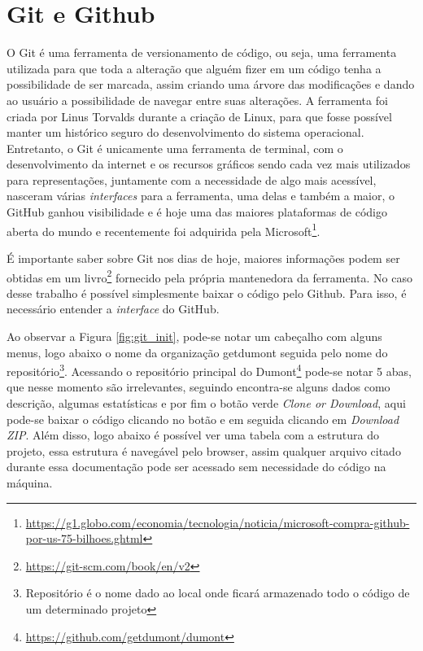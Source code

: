 \chapter{Git e Github}
\label{app:git}
O Git é uma ferramenta de versionamento de código, ou seja, uma ferramenta utilizada para que toda a alteração que alguém fizer em um código tenha a possibilidade de ser marcada, assim criando uma árvore das modificações e dando ao usuário a possibilidade de navegar entre suas alterações. A ferramenta foi criada por Linus Torvalds durante a criação de Linux, para que fosse possível manter um histórico seguro do desenvolvimento do sistema operacional. Entretanto, o Git é unicamente uma ferramenta de terminal, com o desenvolvimento da internet e os recursos gráficos sendo cada vez mais utilizados para representações, juntamente com a necessidade de algo mais acessível, nasceram várias \textit{interfaces} para a ferramenta, uma delas e também a maior, o GitHub ganhou visibilidade e é hoje uma das maiores plataformas de código aberta do mundo e recentemente foi adquirida pela Microsoft\footnote{\url{https://g1.globo.com/economia/tecnologia/noticia/microsoft-compra-github-por-us-75-bilhoes.ghtml}}.

É importante saber sobre Git nos dias de hoje, maiores informações podem ser obtidas em um livro\footnote{\url{https://git-scm.com/book/en/v2}} fornecido pela própria mantenedora da ferramenta. No caso desse trabalho é possível simplesmente baixar o código pelo Github. Para isso, é necessário entender a \textit{interface} do GitHub.

Ao observar a Figura \ref{fig:git_init}, pode-se notar um cabeçalho com alguns menus, logo abaixo o nome da organização getdumont seguida pelo nome do repositório\footnote{Repositório é o nome dado ao local onde ficará armazenado todo o código de um determinado projeto}. Acessando o repositório principal do Dumont\footnote{\url{https://github.com/getdumont/dumont}} pode-se notar 5 abas, que nesse momento são irrelevantes, seguindo encontra-se alguns dados como descrição, algumas estatísticas e por fim o botão verde \textit{Clone or Download}, aqui pode-se baixar o código clicando no botão e em seguida clicando em \textit{Download ZIP}. Além disso, logo abaixo é possível ver uma tabela com a estrutura do projeto, essa estrutura é navegável pelo browser, assim qualquer arquivo citado durante essa documentação pode ser acessado sem necessidade do código na máquina.

